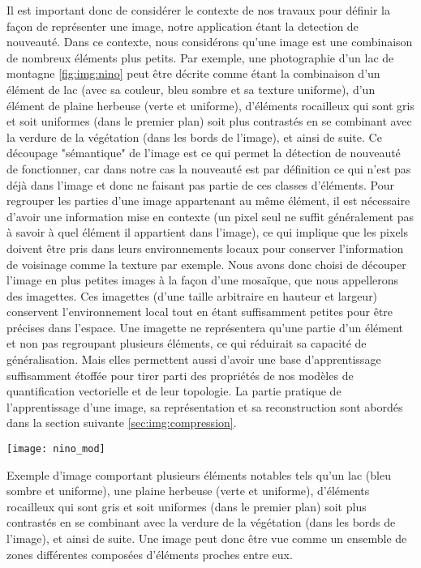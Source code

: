 	Il est important donc de considérer le contexte de nos travaux pour définir la façon de représenter une image, notre application étant la detection de nouveauté. Dans ce contexte, nous considérons qu'une image est une combinaison de nombreux éléments plus petits. Par exemple, une photographie d'un lac de montagne \ref{fig:img:nino} peut être décrite comme étant la combinaison d'un élément de lac (avec sa couleur, bleu sombre et sa texture uniforme), d'un élément de plaine herbeuse (verte et uniforme), d'éléments rocailleux qui sont gris et soit uniformes (dans le premier plan) soit plus contrastés en se combinant avec la verdure de la végétation (dans les bords de l'image), et ainsi de suite. Ce découpage "sémantique" de l'image est ce qui permet la détection de nouveauté  de fonctionner, car dans notre cas la nouveauté est par définition ce qui n'est pas déjà dans l'image et donc ne faisant pas partie de ces classes d'éléments. Pour regrouper les parties d'une image appartenant au même élément, il est nécessaire d'avoir une information mise en contexte (un pixel seul ne suffit généralement pas à savoir à quel élément il appartient dans l'image), ce qui implique que les pixels doivent être pris dans leurs environnements locaux pour conserver l'information de voisinage comme la texture par exemple. Nous avons donc choisi de découper l'image en plus petites images à la façon d'une mosaïque, que nous appellerons des imagettes. Ces imagettes (d'une taille arbitraire en hauteur et largeur) conservent l'environnement local tout en étant suffisamment petites pour être précises dans l'espace. Une imagette ne représentera qu'une partie d'un élément et non pas regroupant plusieurs éléments, ce qui réduirait sa capacité de généralisation. Mais elles permettent aussi d'avoir une base d'apprentissage suffisamment étoffée pour tirer parti des propriétés de nos modèles de quantification vectorielle et de leur topologie. La partie pratique de l'apprentissage d'une image, sa représentation et sa reconstruction sont abordés dans la section suivante \ref{sec:img:compression}.


	\begin{figureth}
		\texttt{[image: nino\_mod]}
		\caption[Lac de Nino]{Exemple d'image comportant plusieurs éléments notables tels qu'un lac (bleu sombre et uniforme), une plaine herbeuse (verte et uniforme), d'éléments rocailleux qui sont gris et soit uniformes (dans le premier plan) soit plus contrastés en se combinant avec la verdure de la végétation (dans les bords de l'image), et ainsi de suite. Une image peut donc être vue comme un ensemble de zones différentes composées d'éléments proches entre eux.\footnotemark}\label{fig:img:nino}
	\end{figureth}


